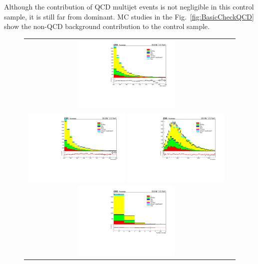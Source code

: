 Although the contribution of QCD multijet events is not negligible in this 
control sample, it is still far from dominant.
MC studies in the Fig.~\ref{fig:BasicCheckQCD} show the non-QCD background contribution to the 
control sample.
\begin{figure}[hp]
\begin{center}
\begin{tabular}{cc}
\includegraphics[width=0.49\textwidth]{sections/mc4/Backgrounds/QCD/figures/84sb/_met_BasicCheck.pdf}\\
\includegraphics[width=0.49\textwidth]{sections/mc4/Backgrounds/QCD/figures/84sb/_mt2_BasicCheck.pdf}
\includegraphics[width=0.49\textwidth]{sections/mc4/Backgrounds/QCD/figures/84sb/_ht_BasicCheck.pdf}\\
\includegraphics[width=0.49\textwidth]{sections/mc4/Backgrounds/QCD/figures/84sb/_nbjets_BasicCheck.pdf}

\end{tabular}
\end{center}
\end{figure}
